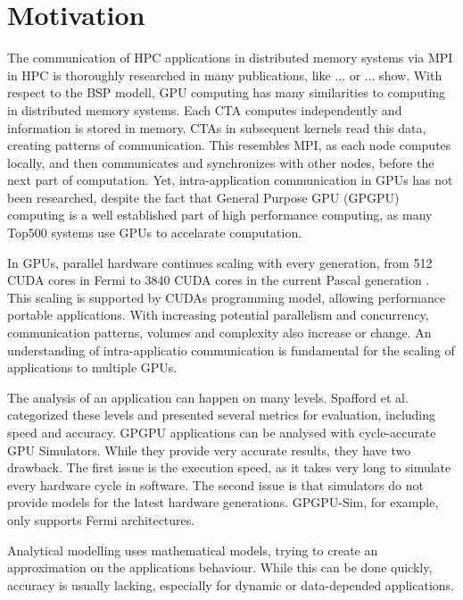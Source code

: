 \chapter{Motivation}
The communication of HPC applications in distributed memory systems via MPI in HPC is thoroughly researched in many publications, like ... or ... show.
With respect to the BSP modell, GPU computing has many similarities to computing in distributed memory systems. Each CTA computes independently and information is stored in memory. CTAs in subsequent kernels read this data, creating patterns of communication. This resembles MPI, as each node computes locally, and then communicates and synchronizes with other nodes, before the next part of computation.
Yet, intra-application communication in GPUs has not been researched, despite the fact that General Purpose GPU (GPGPU) computing is a well established part of high performance computing, as many Top500 
systems \cite{Top500} use GPUs to accelarate computation. 

In GPUs, parallel hardware continues scaling with every generation, from 512 CUDA cores in Fermi  \cite{FermiPaper} to 3840 CUDA cores in the current Pascal generation \cite{PascalPaper}. This scaling is supported by CUDAs programming model, allowing performance portable applications. With increasing potential parallelism and concurrency, communication patterns, volumes and complexity also increase or change.
An understanding of intra-applicatio communication is fundamental for the scaling of applications to multiple
GPUs.


The analysis of an application can happen on many levels. Spafford et al. \cite{Spafford:2012:ADS:2388996.2389110} categorized these levels and presented several 
metrics for evaluation, including speed and accuracy. GPGPU applications can be analysed with cycle-accurate GPU Simulators. While they provide very accurate results, they have two drawback. 
The first issue is the execution speed, as it takes very long to simulate every hardware cycle in software. 
The second issue is that simulators do not provide models for the latest hardware generations. GPGPU-Sim, for example, only supports Fermi architectures. \cite{gpgpu}

Analytical modelling uses mathematical models, trying to create an approximation on the applications behaviour.
While this can be done quickly, accuracy is usually lacking, especially for dynamic or data-depended applications.

